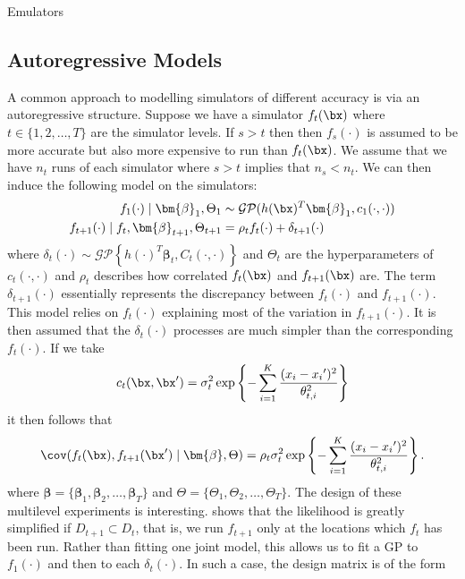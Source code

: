 \begin{chapter}{Emulators \label{Ch:Emulators}}
\subsection{Autoregressive Models}
A common approach to modelling simulators of different accuracy is via an autoregressive structure. Suppose we have a simulator $f_t(\bx)$ where $t \in \{1, 2, \ldots, T\}$ are the simulator levels. If $s>t$ then then $f_s(\cdot)$ is assumed to be more accurate but also more expensive to run than $f_t(\bx)$. We assume that we have $n_t$ runs of each simulator where $s > t$ implies that $n_s < n_t$. We can then induce the following model on the simulators:
\begin{align}
  f_1(\cdot) \mid \bm{\beta}_1, \Theta_1 &\sim \mathcal{GP}(h(\bx)^T \bm{\beta}_1, c_1(\cdot, \cdot))\\
  f_{t+1}(\cdot) \mid f_{t}, \bm{\beta}_{t+1}, \Theta_{t+1}&= \rho_{t}f_{t}(\cdot) + \delta_{t+1} (\cdot)
\end{align}
where $\delta_t(\cdot) \sim \mathcal{GP}\left\{h(\cdot)^T\bm{\beta}_t, C_t(\cdot, \cdot) \right\}$ and $\Theta_t$ are the hyperparameters of $c_t(\cdot,\cdot)$ and $\rho_t$ describes how correlated $f_t(\bx)$ and $f_{t+1}(\bx)$ are. The term $\delta_{t+1}(\cdot)$ essentially represents the discrepancy between $f_t(\cdot)$ and $f_{t+1}(\cdot)$. This model relies on $f_t(\cdot)$ explaining most of the variation in $f_{t+1}(\cdot)$. It is then assumed that the $\delta_t(\cdot)$ processes are much simpler than the corresponding $f_t(\cdot)$.
If we take \begin{equation}
  c_t(\bx, \bx') = \sigma_t^2 \exp \left\{ - \sum_{i = 1}^K \frac{(x_{i} - {x_i}')^2}{\theta_{t,i}^2} \right\}
\end{equation} it then follows that \begin{equation}
  \cov(f_t(\bx), f_{t+1}(\bx')\mid \bm{\beta}, \Theta) = \rho_t \sigma_t^2 \exp \left\{ - \sum_{i = 1}^K \frac{(x_i - {x_i}')^2}{\theta_{t,i}^2} \right\}.
\end{equation}
where $\bm{\beta} = \{\bm{\beta}_1, \bm{\beta}_2, \ldots, \bm{\beta}_T\}$ and $\Theta = \{\Theta_1, \Theta_2, \ldots, \Theta_T\}$.
The design of these multilevel experiments is interesting. \citet{Kennedy2000} shows that the likelihood is greatly simplified if $D_{t+1} \subset D_t$, that is, we run $f_{t+1}$ only at the locations which $f_t$ has been run. Rather than fitting one joint model, this allows us to fit a GP to $f_1(\cdot)$ and then to each $\delta_t(\cdot)$. In such a case, the design matrix is of the form

\end{chapter}
